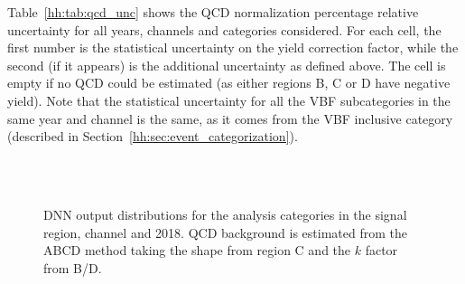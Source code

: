 \documentclass[../main.tex]{subfiles}
\begin{document}
Table~\ref{hh:tab:qcd_unc} shows the QCD normalization percentage relative uncertainty for all years, channels and categories considered. For each cell, the first number is the statistical uncertainty on the yield correction factor, while the second (if it appears) is the additional uncertainty as defined above. The cell is empty if no QCD could be estimated (as either regions B, C or D have negative yield). Note that the statistical
uncertainty for all the VBF subcategories in the same year and channel is the same, as it comes from the VBF inclusive category (described in Section~\ref{hh:sec:event_categorization}).


\begin{figure}[h!]
\begin{center}
 \\
 \\
\end{center}
\caption[DNN output distributions taking QCD shape from region C]{DNN output distributions for the analysis categories in the signal region, \tauh\tauh{} channel and 2018. QCD background is estimated from the ABCD method taking the shape from region C and the $k$ factor from B/D.}
\label{hh:fig:qcd_shape_from_c}
\end{figure}
\end{document}
